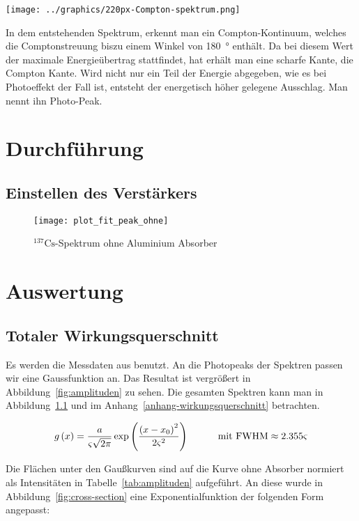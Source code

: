 \documentclass[11pt, ngerman, fleqn, DIV=15, headinclude, BCOR=2cm]{scrreprt}
\newcommand{\plotwidth}{0.8\linewidth}
\begin{document}
\texttt{[image: ../graphics/220px-Compton-spektrum.png]}

In dem entstehenden Spektrum, erkennt man ein Compton-Kontinuum, welches die 
Comptonstreuung biszu einem Winkel von \SI{180}{\degree} enthält. Da bei diesem
Wert der maximale Energieübertrag stattfindet, hat erhält man eine scharfe Kante, 
die Compton Kante. Wird nicht nur ein Teil der Energie abgegeben, wie es bei 
Photoeffekt der Fall ist, entsteht der energetisch höher gelegene Ausschlag. Man 
nennt ihn Photo-Peak.


\chapter{Durchführung}

\section{Einstellen des Verstärkers}
\begin{figure}[h]
    \centering
    \texttt{[image: plot\_fit\_peak\_ohne]}
    \caption{%
	    $^{137}\text{Cs}$-Spektrum ohne Aluminium Absorber
   }
    \label{fig:plot_fit_peak_ohne}
\end{figure}


\chapter{Auswertung}

\section{Totaler Wirkungsquerschnitt}

Es werden die Messdaten aus \fehlt%
benutzt.
An die Photopeaks der Spektren passen wir eine Gaussfunktion an. Das Resultat
ist vergrößert in Abbildung~\ref{fig:amplituden} zu sehen. Die gesamten
Spektren kann man in Abbildung~\ref{fig:plot_fit_peak_ohne} und im
Anhang~\ref{anhang-wirkungsquerschnitt} betrachten.

\begin{equation}
	g\del x = \frac{a}{\varsigma \sqrt{2 \pi}} \exp\del{\frac{\del
		{x - x_0}^2}{2 \varsigma^2}}
		\quad \quad \quad \text{mit FWHM} \approx 2.355 \varsigma
\end{equation}

Die Flächen unter den Gaußkurven sind auf die Kurve ohne Absorber normiert als
Intensitäten in Tabelle~\ref{tab:amplituden} aufgeführt. An diese wurde in
Abbildung~\ref{fig:cross-section} eine Exponentialfunktion der folgenden Form
angepasst:
\end{document}
